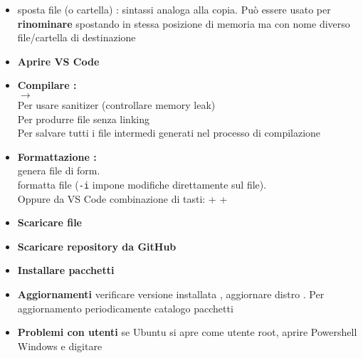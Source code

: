 \documentclass[10pt, oneside]{Book}
\begin{document}
\begin{itemize}
\item {} sposta file (o cartella) : sintassi analoga alla copia. Può essere usato per \textbf{rinominare} spostando in stessa posizione di memoria ma con nome diverso file/cartella di destinazione

\item \textbf{Aprire VS Code} 

\item \textbf{Compilare : } 
\\ $\rightarrow$ 
\\Per usare sanitizer (controllare memory leak) 
\\Per produrre file senza linking 
\\Per salvare tutti i file intermedi generati nel processo di compilazione 

\item \textbf{Formattazione : }
\\ genera file di form.
\\ formatta file (\texttt{-i} impone modifiche direttamente sul file). 
\\Oppure da VS Code combinazione di tasti:  + \boxed{\texttt{$\uparrow$ \quad}} +  

\item \textbf{Scaricare file}  
\item \textbf{Scaricare repository da GitHub} 
\item \textbf{Installare pacchetti} 

\item \textbf{Aggiornamenti} verificare versione installata , aggiornare distro . Per aggiornamento periodicamente catalogo pacchetti  

\item \textbf{Problemi con utenti} se Ubuntu si apre come utente root, aprire Powershell Windows e digitare 
\\
\end{itemize}
\end{document}
